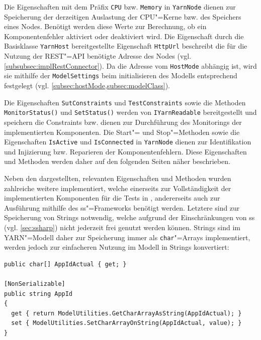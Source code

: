 Die Eigenschaften mit dem Präfix \texttt{CPU} bzw. \texttt{Memory} in \texttt{YarnNode} dienen zur Speicherung der derzeitigen Auslastung der CPU"=Kerne bzw. des Speichers eines Nodes.
Benötigt werden diese Werte zur Berechnung, ob ein Komponentenfehler aktiviert oder deaktiviert wird.
Die Eigenschaft durch die Basisklasse \texttt{YarnHost} bereitgestellte Eigenschaft \texttt{HttpUrl} beschreibt die für die Nutzung der \gls{REST}"=API benötigte Adresse des Nodes (vgl. \cref{subsubsec:implRestConnector}).
Da die Adresse vom \texttt{HostMode} abhängig ist, wird sie mithilfe der \texttt{ModelSettings} beim initialisieren des Modells entsprechend festgelegt (vgl. \cref{subsec:hostMode,subsec:modelClass}).

Die Eigenschaften \texttt{SutConstraints} und \texttt{TestConstraints} sowie die Methoden \texttt{MonitorStatus()} und \texttt{SetStatus()} werden von \texttt{IYarnReadable} bereitgestellt und speichern die Constraints bzw. dienen zur Durchführung des Monitorings der implementierten Komponenten.
Die Start"= und Stop"=Methoden sowie die Eigenschaften \texttt{IsActive} und \texttt{IsConnected} in \texttt{YarnNode} dienen zur Identifikation und Injizierung bzw. Reparieren der Komponentenfehlern.
Diese Eigenschaften und Methoden werden daher auf den folgenden Seiten näher beschrieben.

Neben den dargestellten, relevanten Eigenschaften und Methoden wurden zahlreiche weitere implementiert, welche einerseits zur Vollständigkeit der implementierten Komponenten für die \glspl{Test} in \cite{Eberhardinger2018}, andererseits auch zur Ausführung mithilfe des \gls{ss}"=Frameworks benötigt werden.
Letztere sind \zB zur Speicherung von Strings notwendig, welche aufgrund der Einschränkungen von \gls{ss} (vgl. \cref{sec:ssharp}) nicht jederzeit frei genutzt werden können.
Strings sind im \gls{YARN}"=Modell daher zur Speicherung immer als  \texttt{char}"=Arrays implementiert, werden jedoch zur einfacheren Nutzung im Modell in Strings konvertiert:

\begin{lstlisting}[label=lst:modelCharArrayAsString,style=cs,
caption={[Implementierung der Eigenschaft AppId]
    Implementierung der Eigenschaft \texttt{AppId}.
    Die beiden Methoden \texttt{GetCharArrayAsString} und \texttt{SetCharArrayOnString} führen die Konvertierung in den \texttt{char}"=Array bzw. des \texttt{char}"=Arrays in einen String durch.}]
public char[] AppIdActual { get; }

[NonSerializable]
public string AppId
{
  get { return ModelUtilities.GetCharArrayAsString(AppIdActual); }
  set { ModelUtilities.SetCharArrayOnString(AppIdActual, value); }
}
\end{lstlisting}

